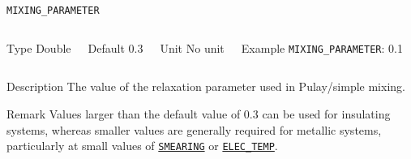 \documentclass[xcolor=dvipsnames,t]{beamer}
\begin{document}
\begin{frame}[allowframebreaks]{\texttt{MIXING\_PARAMETER}} \label{MIXING_PARAMETER}
\vspace*{-12pt}
\begin{columns}
\begin{block}{Type}
Double
\end{block}

\begin{block}{Default}
0.3
\end{block}

\begin{block}{Unit}
No unit
\end{block}

\begin{block}{Example}
\texttt{MIXING\_PARAMETER}: 0.1
\end{block}
\end{columns}

\begin{block}{Description}
The value of the relaxation parameter used in Pulay/simple mixing.
\end{block}

\begin{block}{Remark}
Values larger than the default value of 0.3 can be used for insulating systems, whereas smaller values are generally required for metallic  systems, particularly at small values of \hyperlink{SMEARING}{\texttt{SMEARING}} or \hyperlink{ELEC_TEMP}{\texttt{ELEC\_TEMP}}.
\end{block}

\end{frame}
\end{document}
